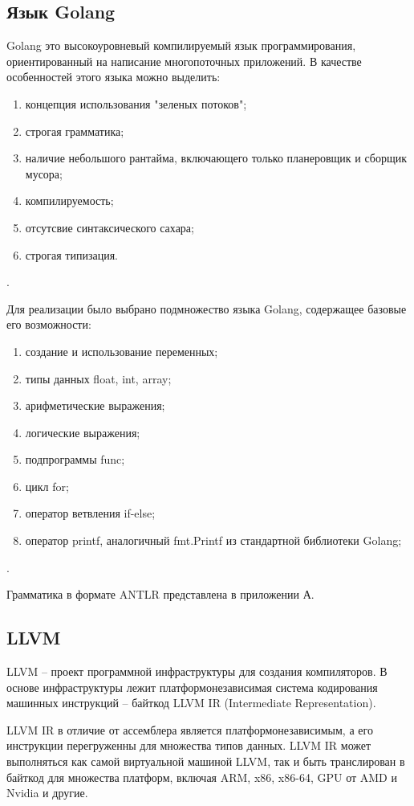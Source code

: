 \subsection{Язык Golang}\label{subsec:grammar}
Golang это высокоуровневый компилируемый язык программирования, ориентированный на написание многопоточных приложений.
В качестве особенностей этого языка можно выделить:
\begin{enumerate}
    \item концепция использования "зеленых потоков";
    \item строгая грамматика;
    \item наличие небольшого рантайма, включающего только планеровщик и сборщик мусора;
    \item компилируемость;
    \item отсутсвие синтаксического сахара;
    \item строгая типизация.
\end{enumerate}.

Для реализации было выбрано подмножество языка Golang, содержащее базовые его возможности:
\begin{enumerate}
    \item создание и использование переменных;
    \item типы данных float, int, array;
    \item арифметические выражения;
    \item логические выражения;
    \item подпрограммы func;
    \item цикл for;
    \item оператор ветвления if-else;
    \item оператор printf, аналогичный fmt.Printf из стандартной библиотеки Golang;
\end{enumerate}.

Грамматика в формате ANTLR представлена в приложении А.

\subsection{LLVM}\label{subsec:llvm}
LLVM – проект программной инфраструктуры для создания компиляторов.
В основе инфраструктуры лежит платформонезависимая система кодирования машинных инструкций – байткод LLVM IR (Intermediate
Representation).

LLVM IR в отличие от ассемблера является платформонезависимым, а его инструкции перегруженны для множества типов данных.
LLVM IR может выполняться как самой виртуальной машиной LLVM, так и быть транслирован в байткод для множества платформ,
включая ARM, x86, x86-64, GPU от AMD и Nvidia и другие.

